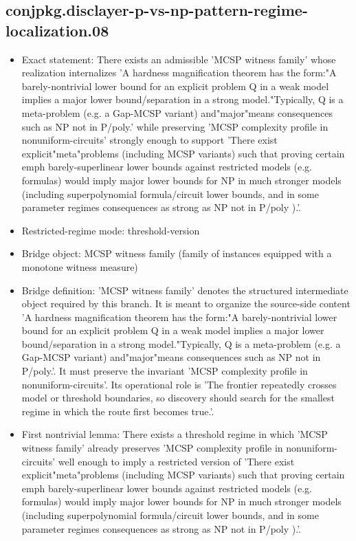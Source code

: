 \documentclass[11pt]{article}
\begin{document}
\subsection*{conjpkg.disclayer-p-vs-np-pattern-regime-localization.08}
\begin{itemize}
\item Exact statement: There exists an admissible 'MCSP witness family' whose realization internalizes 'A hardness magnification theorem has the form:"A barely-nontrivial lower bound for an explicit problem Q in a weak model implies a major lower bound/separation in a strong model."Typically, Q is a meta-problem (e.g. a Gap-MCSP variant) and"major"means consequences such as NP not in P/poly.' while preserving 'MCSP complexity profile in nonuniform-circuits' strongly enough to support 'There exist explicit"meta"problems (including MCSP variants) such that proving certain emph barely-superlinear lower bounds against restricted models (e.g. formulas) would imply major lower bounds for NP in much stronger models (including superpolynomial formula/circuit lower bounds, and in some parameter regimes consequences as strong as NP not in P/poly ).'.
\item Restricted-regime mode: threshold-version
\item Bridge object: MCSP witness family (family of instances equipped with a monotone witness measure)
\item Bridge definition: 'MCSP witness family' denotes the structured intermediate object required by this branch. It is meant to organize the source-side content 'A hardness magnification theorem has the form:"A barely-nontrivial lower bound for an explicit problem Q in a weak model implies a major lower bound/separation in a strong model."Typically, Q is a meta-problem (e.g. a Gap-MCSP variant) and"major"means consequences such as NP not in P/poly.'. It must preserve the invariant 'MCSP complexity profile in nonuniform-circuits'. Its operational role is 'The frontier repeatedly crosses model or threshold boundaries, so discovery should search for the smallest regime in which the route first becomes true.'.
\item First nontrivial lemma: There exists a threshold regime in which 'MCSP witness family' already preserves 'MCSP complexity profile in nonuniform-circuits' well enough to imply a restricted version of 'There exist explicit"meta"problems (including MCSP variants) such that proving certain emph barely-superlinear lower bounds against restricted models (e.g. formulas) would imply major lower bounds for NP in much stronger models (including superpolynomial formula/circuit lower bounds, and in some parameter regimes consequences as strong as NP not in P/poly ).'.

\end{itemize}
\end{document}

